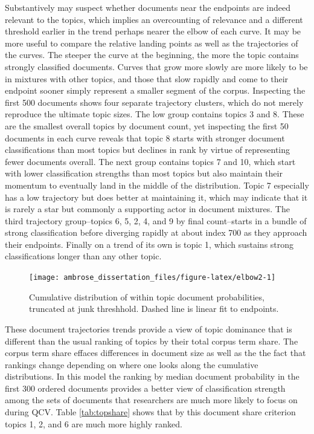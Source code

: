\documentclass[]{book}
\theoremstyle{definition}
\theoremstyle{definition}
\theoremstyle{definition}
\theoremstyle{remark}
\begin{document}
Substantively may suspect whether documents near the endpoints are
indeed relevant to the topics, which implies an overcounting of
relevance and a different threshold earlier in the trend perhaps nearer
the elbow of each curve. It may be more useful to compare the relative
landing points as well as the trajectories of the curves. The steeper
the curve at the beginning, the more the topic contains strongly
classified documents. Curves that grow more slowly are more likely to be
in mixtures with other topics, and those that slow rapidly and come to
their endpoint sooner simply represent a smaller segment of the corpus.
Inspecting the first 500 documents shows four separate trajectory
clusters, which do not merely reproduce the ultimate topic sizes. The
low group contains topics 3 and 8. These are the smallest overall topics
by document count, yet inspecting the first 50 documents in each curve
reveals that topic 8 starts with stronger document classifications than
most topics but declines in rank by virtue of representing fewer
documents overall. The next group contains topics 7 and 10, which start
with lower classification strengths than most topics but also maintain
their momentum to eventually land in the middle of the distribution.
Topic 7 especially has a low trajectory but does better at maintaining
it, which may indicate that it is rarely a star but commonly a
supporting actor in document mixtures. The third trajectory
group--topics 6, 5, 2, 4, and 9 by final count--starts in a bundle of
strong classification before diverging rapidly at about index 700 as
they approach their endpoints. Finally on a trend of its own is topic 1,
which sustains strong classifications longer than any other topic.

\begin{figure}

{\centering \texttt{[image: ambrose\_dissertation\_files/figure-latex/elbow2-1]} 

}

\caption{Cumulative distribution of within topic document probabilities, truncated at junk threshhold. Dashed line is linear fit to endpoints.}\label{fig:elbow2}
\end{figure}

These document trajectories trends provide a view of topic dominance
that is different than the usual ranking of topics by their total corpus
term share. The corpus term share effaces differences in document size
as well as the the fact that rankings change depending on where one
looks along the cumulative distributions. In this model the ranking by
median document probability in the first 300 ordered documents provides
a better view of classification strength among the sets of documents
that researchers are much more likely to focus on during QCV. Table
\ref{tab:topshare} shows that by this document share criterion topics 1,
2, and 6 are much more highly ranked.
\end{document}
